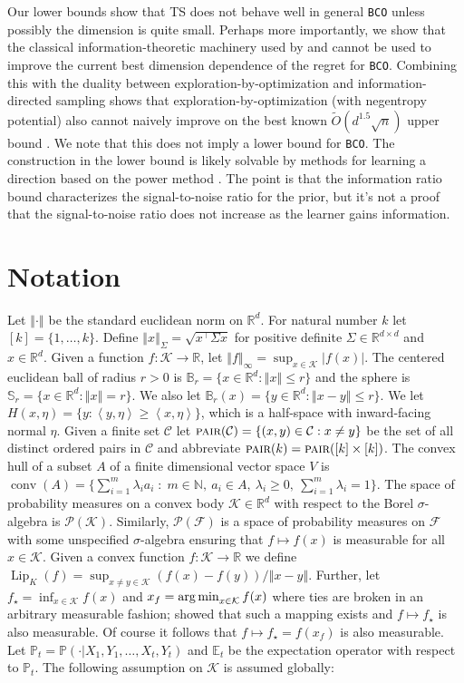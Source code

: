 \documentclass[letter, 12pt]{report}
\newcommand{\pair}{\operatorname{\textsc{pair}}}
\newcommand{\R}{\mathbb R}
\newcommand{\argmin}{\operatornamewithlimits{arg\,min}}
\newcommand{\ip}[1]{\left \langle #1 \right \rangle}
\newcommand{\sphere}{\mathbb{S}}
\newcommand{\ball}{\mathbb{B}}
\newcommand{\norm}[1]{\left \Vert  #1 \right \Vert}
\newcommand{\E}{\mathbb E}
\newcommand{\cK}{\mathcal K}
\newcommand{\cC}{\mathcal C}
\newcommand{\sF}{\mathscr F}
\newcommand{\sP}{\mathscr P}
\newcommand{\bbP}{\mathbb P}
\newcommand{\lip}{\operatorname{Lip}}
\newcommand{\conv}{\operatorname{conv}}
\newcommand{\1}{\mathbf{1}}
\newcommand{\bco}{\texttt{BCO}\xspace}
\newcommand{\ts}{\textsc{TS}\xspace}
\theoremstyle{plain}
\theoremstyle{definition}
\theoremstyle{remark}
\begin{document}
Our lower bounds show that \ts does not behave well in general \bco unless possibly the dimension is quite small.
Perhaps more importantly, we show that the classical information-theoretic machinery used by \cite{BE18} and \cite{Lat20-cvx} cannot be used to improve the current
best dimension dependence of the regret for \bco.
Combining this with the duality between exploration-by-optimization and information-directed sampling
shows that exploration-by-optimization (with negentropy potential) also cannot naively improve on the best known $\tilde O(d^{1.5} \sqrt{n})$ upper bound \citep{ZL19,LG23}.
We note that this does not imply a lower bound for \bco.
The construction in the lower bound is likely solvable by methods for learning a direction based on the power method \citep{lattimore2021bandit,huang2021optimal}.
The point is that the information ratio bound characterizes the signal-to-noise ratio for the prior, but it's not a proof that the signal-to-noise ratio does not increase
as the learner gains information.

\section{Notation}
Let $\norm{\cdot}$ be the standard euclidean norm on $\R^d$.
For natural number $k$ let $[k] = \{1,\ldots,k\}$.
Define $\norm{x}_\Sigma = \sqrt{x^\top \Sigma x}$ for positive definite $\Sigma \in \R^{d\times d}$ and $x \in \R^d$.
Given a function $f : \cK \to \R$, let $\norm{f}_\infty = \sup_{x \in \cK} |f(x)|$.
The centered euclidean ball of radius $r > 0$ is $\ball_r = \{x \in \R^d : \norm{x} \leq r\}$ and
the sphere is $\sphere_r = \{x \in \R^d : \norm{x} = r\}$. We also let $\ball_r(x) = \{y \in \R^d : \norm{x - y} \leq r\}$.
We let $H(x, \eta) = \{y : \ip{y, \eta} \geq \ip{x, \eta}\}$, which is a half-space with inward-facing normal $\eta$.
Given a finite set $\cC$ let $\pair(\cC) = \{(x, y) \in \cC : x \neq y\}$ be the set of all distinct ordered pairs in $\cC$ and abbreviate $\pair(k) = \pair([k] \times [k])$.
The convex hull of a subset $A$ of a finite dimensional vector space $V$ is $\conv(A)=\{ \sum_{i=1}^{m}\lambda_i a_i \;:\; m\in\mathbb{N},\ a_i\in A,\ \lambda_i\ge 0,\ \sum_{i=1}^{m}\lambda_i=1\}$.
The space of probability measures on a convex body $\cK \in \R^d$ with respect to the Borel $\sigma$-algebra is $\sP(\cK)$.
Similarly, $\sP(\sF)$ is a space of probability measures on $\sF$ with some unspecified $\sigma$-algebra ensuring that $f \mapsto f(x)$
is measurable for all $x \in \cK$.
Given a convex function $f : \cK \to \R$ we define $\lip_K(f) = \sup_{x \neq y \in \cK} (f(x) - f(y)) / \norm{x - y}$.
Further, let $f_\star = \inf_{x \in \cK} f(x)$ and $x_f = \argmin_{x \in \cK} f(x)$ where ties are broken in an arbitrary measurable fashion;
\citep{niemiro1992asymptotics} showed that such a mapping exists and $f \mapsto f_\star$ is also measurable.
Of course it follows that $f \mapsto f_\star = f(x_f)$ is also measurable.
Let $\bbP_t = \bbP(\cdot|X_1,Y_1,\ldots,X_t,Y_t)$ and $\E_t$ be the expectation operator with respect to $\bbP_t$.
The following assumption on $\cK$ is assumed globally:
\end{document}
